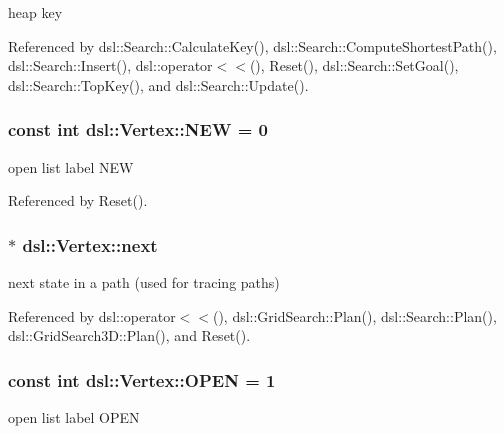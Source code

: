 heap key 



\-Referenced by dsl\-::\-Search\-::\-Calculate\-Key(), dsl\-::\-Search\-::\-Compute\-Shortest\-Path(), dsl\-::\-Search\-::\-Insert(), dsl\-::operator$<$$<$(), \-Reset(), dsl\-::\-Search\-::\-Set\-Goal(), dsl\-::\-Search\-::\-Top\-Key(), and dsl\-::\-Search\-::\-Update().

\subsubsection[{\-N\-E\-W}]{\setlength{\rightskip}{0pt plus 5cm}const int {\bf dsl\-::\-Vertex\-::\-N\-E\-W} = 0\hspace{0.3cm}{\ttfamily  [static, protected]}}\label{classdsl_1_1Vertex_a44275282e5f7b0be43bcc153621f1f6d}


open list label \-N\-E\-W 



\-Referenced by \-Reset().

\subsubsection[{next}]{$\ast$ {\bf dsl\-::\-Vertex\-::next}}\label{classdsl_1_1Vertex_a8d1304ddb4aac965291b30f25d8a24a4}


next state in a path (used for tracing paths) 



\-Referenced by dsl\-::operator$<$$<$(), dsl\-::\-Grid\-Search\-::\-Plan(), dsl\-::\-Search\-::\-Plan(), dsl\-::\-Grid\-Search3\-D\-::\-Plan(), and \-Reset().

\subsubsection[{\-O\-P\-E\-N}]{\setlength{\rightskip}{0pt plus 5cm}const int {\bf dsl\-::\-Vertex\-::\-O\-P\-E\-N} = 1\hspace{0.3cm}{\ttfamily  [static, protected]}}\label{classdsl_1_1Vertex_a76be5b53d16bd35ef36992609b05b5e1}


open list label \-O\-P\-E\-N 




